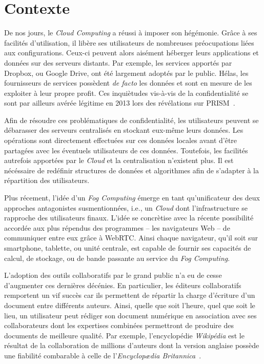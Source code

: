 
\section{Contexte}

De nos jours, le \emph{Cloud Computing} a réussi à imposer son hégémonie. Grâce
à ses facilités d'utilisation, il libère ses utilisateurs de nombreuses
préocupations liées aux configurations. Ceux-ci peuvent alors aisément héberger
leurs applications et données sur des serveurs distants. Par exemple, les
services apportés par Dropbox, ou Google Drive, ont été largement adoptés par le
public.  Hélas, les fournisseurs de services possèdent \emph{de facto} les
données et sont en mesure de les exploiter à leur propre profit. Ces inquiètudes
vis-à-vis de la confidentialité se sont par ailleurs avérée légitime en 2013
lors des révélations sur PRISM~\cite{gellman2013us}.

Afin de résoudre ces problématiques de confidentialité, les utilisateurs peuvent
se débarasser des serveurs centralisés en stockant eux-même leurs données. Les
opérations sont directement effectuées sur ces données locales avant d'être
partagées avec les éventuels utilisateurs de ces données. Toutefois, les
facilités autrefois apportées par le \emph{Cloud} et la centralisation
n'existent plus. Il est nécéssaire de redéfinir structures de données et
algorithmes afin de s'adapter à la répartition des utilisateurs.

Plus récement, l'idée d'un \emph{Fog Computing} émerge en tant qu'unificateur
des deux approches antagonistes susmentionnées, i.e., un \emph{Cloud} dont
l'infrastructure se rapproche des utilisateurs finaux. L'idée se concrètise avec
la récente possibilité accordée aux plus répendus des programmes -- les
navigateurs Web -- de communiquer entre eux grâce à WebRTC. Ainsi chaque
navigateur, qu'il soit sur smartphone, tablette, ou unité centrale, est capable
de fournir ses capacités de calcul, de stockage, ou de bande passante au service
du \emph{Fog Computing}.

L'adoption des outils collaboratifs par le grand public n'a eu de cesse
d'augmenter ces dernières décénies. En particulier, les éditeurs
collaboratifs~\cite{ellis1991groupware} remportent un vif succès car ils
permettent de répartir la charge d'écriture d'un document entre différents
auteurs. Ainsi, quelle que soit l'heure, quel que soit le lieu, un utilisateur
peut rédiger son document numérique en association avec ses collaborateurs dont
les expertises combinées permettront de produire des documents de meilleure
qualité. Par exemple, l'encyclopédie \emph{Wikipédia} est le résultat de la
collaboration de millions d'auteurs dont la version anglaise possède une
fiabilité combarable à celle de l'\emph{Encyclop\ae{}dia
Britannica}~\cite{giles2005internet}.

